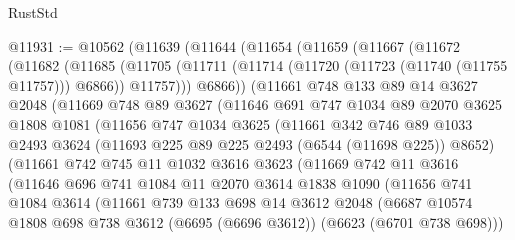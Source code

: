 \begin{lexlean}{RustStd}
\begin{coremodule}
@11931 := @10562
    (@11639
      (@11644
        (@11654
          (@11659
            (@11667
              (@11672
                (@11682
                  (@11685
                    (@11705
                      (@11711 (@11714 (@11720 (@11723 (@11740 (@11755 @11757))) @6866)) @11757)))
                  @6866))
              (@11661
                @748
                @133
                @89
                @14
                @3627
                @2048
                (@11669
                  @748
                  @89
                  @3627
                  (@11646
                    @691
                    @747
                    @1034
                    @89
                    @2070
                    @3625
                    @1808
                    @1081
                    (@11656
                      @747
                      @1034
                      @3625
                      (@11661
                        @342
                        @746
                        @89
                        @1033
                        @2493
                        @3624
                        (@11693 @225 @89 @225 @2493 (@6544 (@11698 @225)) @8652)
                        (@11661
                          @742
                          @745
                          @11
                          @1032
                          @3616
                          @3623
                          (@11669
                            @742
                            @11
                            @3616
                            (@11646
                              @696
                              @741
                              @1084
                              @11
                              @2070
                              @3614
                              @1838
                              @1090
                              (@11656
                                @741
                                @1084
                                @3614
                                (@11661
                                  @739
                                  @133
                                  @698
                                  @14
                                  @3612
                                  @2048
                                  (@6687
                                    @10574
                                    @1808
                                    @698
                                    @738
                                    @3612
                                    (@6695 (@6696 @3612))
                                    (@6623 (@6701 @738 @698)))

\end{coremodule}
\end{lexlean}
